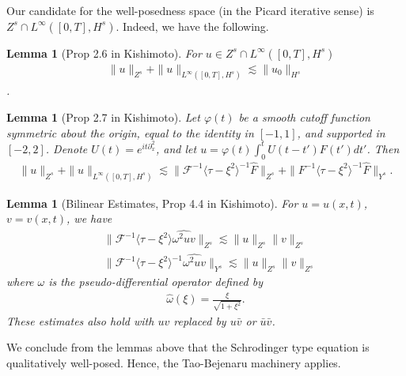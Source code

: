 \documentclass{amsart}
\newtheorem{lemma}[theorem]{Lemma}
\newcommand{\wh}{\widehat}
\newcommand{\vp}{\varphi}
\newcommand{\p}{\partial}
\begin{document}
%
%
Our candidate for the well-posedness space (in the Picard iterative sense) is
$Z^{s} \cap L^{\infty}\left( [0, T], H^{s} \right)$. Indeed, we have the
following.
%
%
%
%
%
%
%
%
%
%
\begin{lemma}[Prop 2.6 in Kishimoto]
  For $u \in Z^{s} \cap L^{\infty}\left( [0,T], H^{s} \right)$
  \begin{equation*}
  \begin{split}
    \| u \|_{Z^{s}} + \| u \|_{L^{\infty}\left( [0,T], H^{s} \right)} \lesssim
    \| u_{0} \|_{H^{s}}
  \end{split}
  \end{equation*}
\label{lem:init-data-b}.
\end{lemma}
%
%
%
%
%
%
%                
%
%
%
%
\begin{lemma}[Prop 2.7 in Kishimoto]
  Let $\vp(t)$ be a smooth cutoff
  function symmetric about the origin, equal to the identity in $[-1, 1]$, and
  supported in $[-2,2]$. Denote $U(t) = e^{it \p_{x}^{2}}$, and let 
  $u = \vp(t) \int_{0}^{t} U(t - t') F(t') dt'$. Then
  \begin{equation*}
  \begin{split}
    \| u \|_{Z^{s}} + \| u \|_{L^{\infty}\left( [0,T], H^{s} \right)} \lesssim
    \| \mathcal{F}^{-1} \langle \tau - \xi^{2} \rangle ^{-1} \wh{F}
    \|_{Z^{s}} + \| F^{-1}\langle \tau - \xi^{2} \rangle^{-1} \wh{F}
    \|_{Y^{s}}.
  \end{split}
  \end{equation*}
  \label{lem:non-lin-to-bilin}
\end{lemma}
%
%
%
%
%
%
%
%
%
%
\begin{lemma}[Bilinear Estimates, Prop 4.4 in Kishimoto]
For $u = u(x,t)$, $v = v(x,t)$, we have
%
%
\begin{equation*}
\begin{split}
  & \|\mathcal{F}^{-1} \langle \tau - \xi^{2} \rangle \wh{\omega^{2} uv}
  \|_{Z^{s}} \lesssim \| u \|_{Z^{s}} \|v \|_{Z^{s}}
  \\
  & \| \mathcal{F}^{-1} \langle \tau - \xi^{2} \rangle ^{-1} \wh{\omega^{2} uv}
  \|_{Y^{s}} \lesssim \| u \|_{Z^{s}} \| v \|_{Z^{s}}
\end{split}
\end{equation*}
%
where $\omega$ is the pseudo-differential operator defined by
%
%
\begin{equation*}
\begin{split}
  \wh{\omega}(\xi) = \frac{\xi}{ \sqrt{1 + \xi^{2}}}.
\end{split}
\end{equation*}
%
%
These estimates also hold with $uv$ replaced by $u \bar v$ or $\bar u \bar v$.
%
\label{lem:bilinear-estimates}
\end{lemma}
%
%
We conclude from the lemmas above that the Schrodinger type equation is
qualitatively well-posed. Hence, the Tao-Bejenaru machinery applies.



\end{document}
